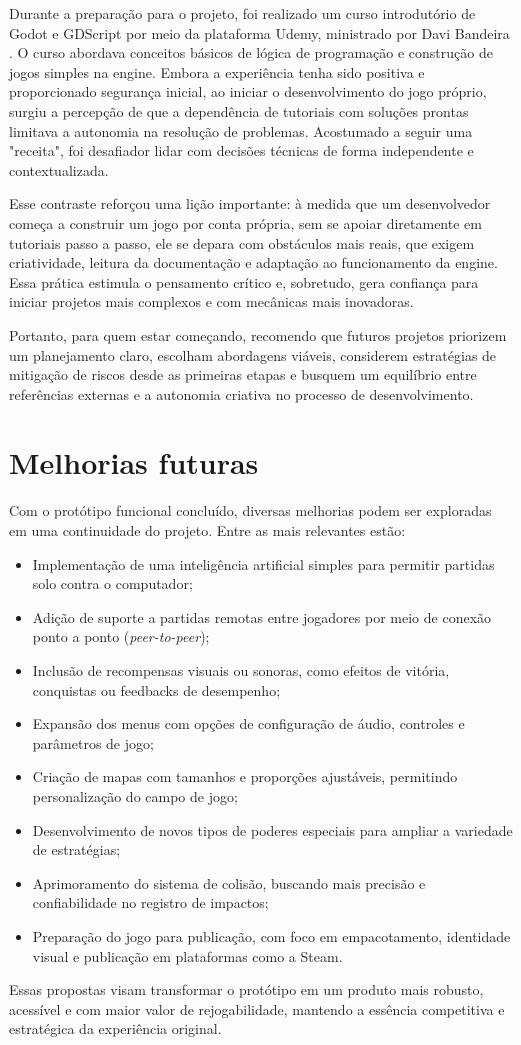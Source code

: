 Durante a preparação para o projeto, foi realizado um curso introdutório de Godot e GDScript por meio da plataforma Udemy, ministrado por Davi Bandeira \cite{bandeira2024godot}. O curso abordava conceitos básicos de lógica de programação e construção de jogos simples na engine. Embora a experiência tenha sido positiva e proporcionado segurança inicial, ao iniciar o desenvolvimento do jogo próprio, surgiu a percepção de que a dependência de tutoriais com soluções prontas limitava a autonomia na resolução de problemas. Acostumado a seguir uma "receita", foi desafiador lidar com decisões técnicas de forma independente e contextualizada.

Esse contraste reforçou uma lição importante: à medida que um desenvolvedor começa a construir um jogo por conta própria, sem se apoiar diretamente em tutoriais passo a passo, ele se depara com obstáculos mais reais, que exigem criatividade, leitura da documentação e adaptação ao funcionamento da engine. Essa prática estimula o pensamento crítico e, sobretudo, gera confiança para iniciar projetos mais complexos e com mecânicas mais inovadoras.

Portanto, para quem estar começando, recomendo que futuros projetos priorizem um planejamento claro, escolham abordagens viáveis, considerem estratégias de mitigação de riscos desde as primeiras etapas e busquem um equilíbrio entre referências externas e a autonomia criativa no processo de desenvolvimento.


\section{Melhorias futuras}

Com o protótipo funcional concluído, diversas melhorias podem ser exploradas em uma continuidade do projeto. Entre as mais relevantes estão:

\begin{itemize}
  \item Implementação de uma inteligência artificial simples para permitir partidas solo contra o computador;
  \item Adição de suporte a partidas remotas entre jogadores por meio de conexão ponto a ponto (\textit{peer-to-peer});
  \item Inclusão de recompensas visuais ou sonoras, como efeitos de vitória, conquistas ou feedbacks de desempenho;
  \item Expansão dos menus com opções de configuração de áudio, controles e parâmetros de jogo;
  \item Criação de mapas com tamanhos e proporções ajustáveis, permitindo personalização do campo de jogo;
  \item Desenvolvimento de novos tipos de poderes especiais para ampliar a variedade de estratégias;
  \item Aprimoramento do sistema de colisão, buscando mais precisão e confiabilidade no registro de impactos;
  \item Preparação do jogo para publicação, com foco em empacotamento, identidade visual e publicação em plataformas como a Steam.
\end{itemize}

Essas propostas visam transformar o protótipo em um produto mais robusto, acessível e com maior valor de rejogabilidade, mantendo a essência competitiva e estratégica da experiência original.
